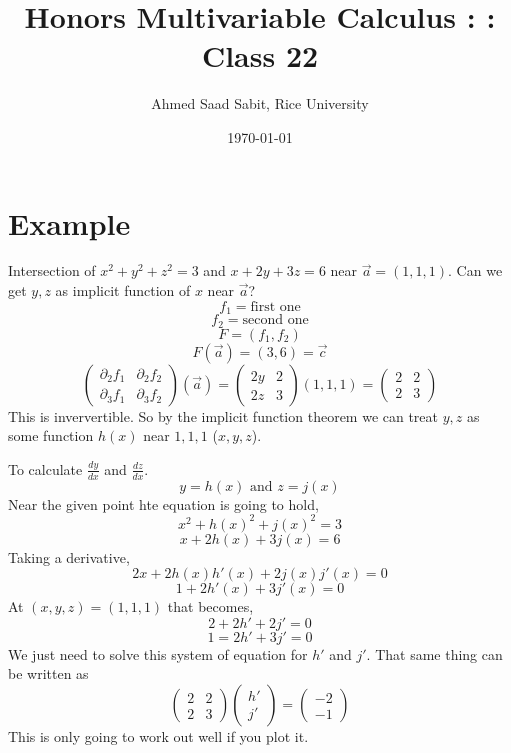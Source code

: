 \documentclass[letter]{article}
\title{Honors Multivariable Calculus : : Class 22}
\author{Ahmed Saad Sabit, Rice University}
\date{\today}
\begin{document}
\maketitle
{}

\section*{Example} 
Intersection of $x^2 + y^2 + z^2 = 3$ and $x + 2y + 3z = 6$ near $\vec{a} = (1,1,1)$. Can we get $y,z$ as implicit function of $x$ near $\vec{a}$? 
\[
f_1 = \text{first one}
\] 
\[
f_2 = \text{second one}
\]
\[
F = (f_1, f_2)
\] 
\[
F(\vec{a}) = (3,6) = \vec{c}
\]
\[
	\begin{pmatrix} \partial_2f_1 & \partial_2 f_2 \\ \partial_3f_1 & \partial_3f_2 \end{pmatrix} (\vec{a}) = 
	\begin{pmatrix} 2 y & 2 \\ 2z & 3 \end{pmatrix}  (1,1,1) = \begin{pmatrix} 2 & 2 \\ 2 & 3 \end{pmatrix} 
\]
This is inververtible. So by the implicit function theorem we can treat $y,z$ as some function $h(x)$ near $1,1,1$ ($x,y,z$). 

To calculate $\frac{dy}{dx}$ and $\frac{dz}{dx}$. 
\[
y = h(x) \text{ and } z = j(x)
\]
Near the given point hte equation is going to hold, 
\[
x^2 + h(x)^2 + j(x)^2 = 3
\] 
\[
x + 2 h (x) + 3 j(x) = 6
\]
Taking a derivative, 
\[
2x + 2 h(x) h'(x) + 2 j(x) j'(x) = 0
\] 
\[
1 + 2 h'(x) + 3 j' (x) = 0
\] 
At $(x,y,z) = (1,1,1)$ that becomes, 
\[
2 + 2h' + 2j' = 0
\] 
\[
1 = 2h' + 3j' = 0
\] 
We just need to solve this system of equation for $h'$ and $j'$.
That same thing can be written as
\[
	\begin{pmatrix} 2 & 2 \\ 2 & 3 \end{pmatrix}  
	\begin{pmatrix} h' \\ j' \end{pmatrix} = 
	\begin{pmatrix} -2 \\ -1\end{pmatrix} 
\]
This is only going to work out well if you plot it. 
\end{document}
